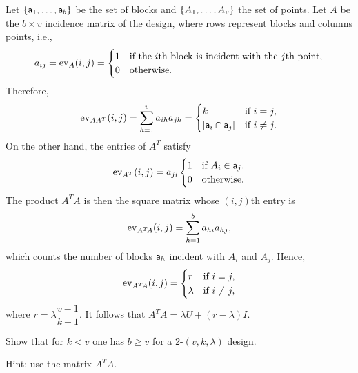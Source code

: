 \begin{solution}
   Let $\{\mathsf a_1,\dots,\mathsf a_b\}$ be the set of blocks and $\{A_1,\dots,A_v\}$ the set of points. Let $A$ be the $b\times v$ incidence matrix of the design, where rows represent blocks and columns points, i.e.,
    $$
        a_{ij} = {\rm ev}_{A}(i,j) = \begin{cases}
            1
                &\text{if the $i$th block is incident with the $j$th point},\\
            0   &\text{otherwise}.
        \end{cases}
    $$
    Therefore,
    \begin{equation}\label{eq:AA^T}
        {\rm ev}_{AA^T}(i,j) = \sum_{h=1}^va_{ih}a_{jh}
            = \begin{cases}
                k   &\text{if }i=j,\\
                |\mathsf a_i\cap\mathsf a_j|
                    &\text{if }i\ne j.
            \end{cases}
    \end{equation}
    On the other hand, the entries of $A^T$ satisfy
    \[
        {\rm ev}_{A^T}(i,j) = a_{ji}
            \begin{cases}
            1
                &\text{if }A_i\in\mathsf a_j,\\
            0   &\text{otherwise}.
        \end{cases}
    \]
    The product $A^T\!A$ is then the square matrix whose $(i,j)$th entry is
    \[
        {\rm ev}_{A^T\!A}(i,j) = \sum_{h=1}^b a_{hi} a_{hj},
    \]
    which counts the number of blocks $\mathsf a_h$ incident with $A_i$ and $A_j$. Hence,
    \begin{equation}\label{eq:A^TA}
        {\rm ev}_{A^T\!A}(i,j) = 
            \begin{cases}
                r & \text{if } i=j,\\
                \lambda   & \text{if } i\ne j,
            \end{cases}
    \end{equation}
    where $r=\lambda\dfrac{v-1}{k-1}$. It follows that $A^T\!A = \lambda U + (r-\lambda)I$.
\end{solution}

\begin{exr}
    Show that for\/ $k < v$ one has\/ $b \geq v$ for a\/ $2$-$(v,k,\lambda)$ design.
    
    \textrm{\upshape Hint: use the matrix\/ $A^T\!A$.}
\end{exr}

